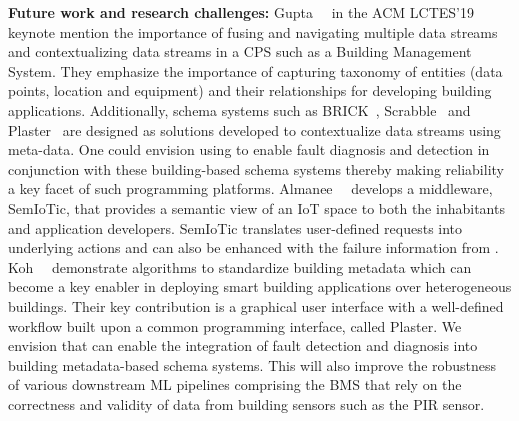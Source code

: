 \noindent \textbf{Future work and research challenges:} Gupta~\etal~\cite{Gupta2019NewMA} in the ACM LCTES'19 keynote mention the importance of fusing and navigating multiple data streams and contextualizing data streams in a CPS such as a Building Management System. They emphasize the importance of capturing taxonomy of entities (\eg data points, location and equipment) and their relationships for developing building applications. Additionally, schema systems such as BRICK~\cite{balaji2016brick}, Scrabble~\cite{10.1145/3276774.3276795} and Plaster~\cite{10.1145/3276774.3276794} are designed as solutions developed to contextualize data streams using meta-data. One could envision using \sol to enable fault diagnosis and detection in conjunction with these building-based schema systems thereby making reliability a key facet of such programming platforms. Almanee~\etal~\cite{almanee2019demo} develops a middleware, SemIoTic, that provides a semantic view of an IoT space to both the inhabitants and application developers. SemIoTic translates user-defined requests into underlying actions and can also be enhanced with the failure information from \sol. Koh~\etal~\cite{koh2019interactive} demonstrate algorithms to standardize building metadata which can become a key enabler in deploying smart building applications over heterogeneous buildings. Their key contribution is a graphical user interface with a well-defined workflow built upon a common programming interface, called Plaster. We envision that \sol can enable the integration of fault detection and diagnosis into building metadata-based schema systems. This will also improve the robustness of various downstream ML pipelines comprising the BMS that rely on the correctness and validity of data from building sensors such as the PIR sensor.




